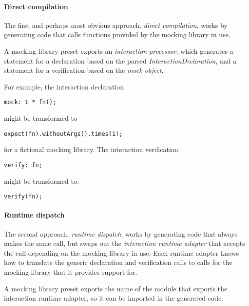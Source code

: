 \paragraph{Direct compilation}
The first and perhaps most obvious approach, \textit{direct compilation},
works by generating code that calls functions
provided by the mocking library in use.

A mocking library preset exports an \textit{interaction processor},
which generates a statement for a declaration
based on the parsed \textit{InteractionDeclaration},
and a statement for a verification
based on the \textit{mock object}.

For example, the interaction declaration
\begin{verbatim}
mock: 1 * fn();
\end{verbatim}
might be transformed to
\begin{verbatim}
expect(fn).withoutArgs().times(1);
\end{verbatim}
for a fictional mocking library.
The interaction verification
\begin{verbatim}
verify: fn;
\end{verbatim}
might be transformed to:
\begin{verbatim}
verify(fn);
\end{verbatim}

\paragraph{Runtime dispatch}
The second approach, \textit{runtime dispatch},
works by generating code that always makes the same call,
but swaps out the \textit{interaction runtime adapter} that accepts the call
depending on the mocking library in use.
Each runtime adapter knows how to translate the generic
declaration and verification calls to calls for the mocking library
that it provides support for.

A mocking library preset exports the name of the module
that exports the interaction runtime adapter,
so it can be imported in the generated code.

